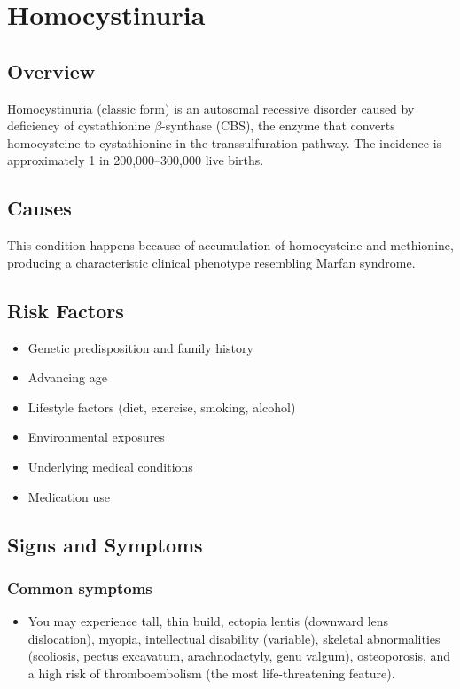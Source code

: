 \chapter{Homocystinuria}
\label{sec:Homocystinuria}

\section{Overview}
Homocystinuria (classic form) is an autosomal recessive disorder caused by deficiency of cystathionine $\beta$-synthase (CBS), the enzyme that converts homocysteine to cystathionine in the transsulfuration pathway. The incidence is approximately 1 in 200,000--300,000 live births.
\section{Causes}
This condition happens because of accumulation of homocysteine and methionine, producing a characteristic clinical phenotype resembling Marfan syndrome.     
\section{Risk Factors}

\begin{itemize}[noitemsep]
  \item Genetic predisposition and family history
  \item Advancing age
  \item Lifestyle factors (diet, exercise, smoking, alcohol)
  \item Environmental exposures
  \item Underlying medical conditions
  \item Medication use
\end{itemize}
\section{Signs and Symptoms}

\subsection{Common symptoms}
\begin{itemize}[noitemsep]
  \item You may experience tall, thin build, ectopia lentis (downward lens dislocation), myopia, intellectual disability (variable), skeletal abnormalities (scoliosis, pectus excavatum, arachnodactyly, genu valgum), osteoporosis, and a high risk of thromboembolism (the most life-threatening feature). 
  \end{itemize}

